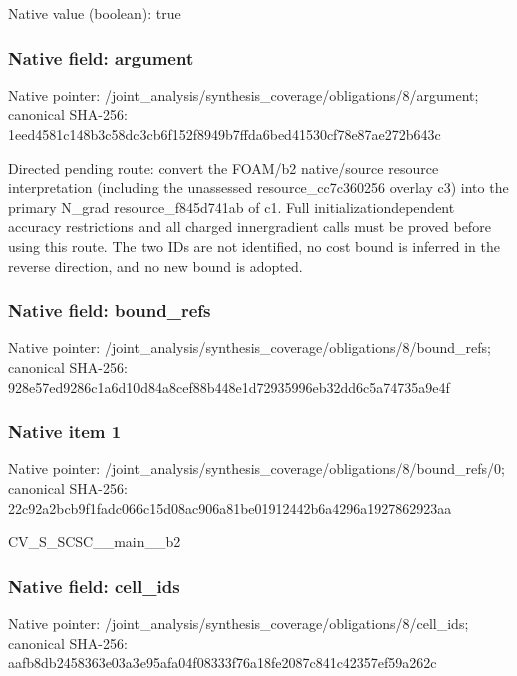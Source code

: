 \documentclass[10pt,a4paper]{article}
\begin{document}
Native value (boolean): true



\subsubsection{Native field: argument}


Native pointer: /joint\_analysis/synthesi\allowbreak{}s\_coverage/obligations/8\allowbreak{}/argument; canonical SHA-256: 1eed4581c148b3c58dc3cb6f\allowbreak{}152f8949b7ffda6bed41530c\allowbreak{}f78e87ae272b643c


Directed pending route: convert the FOAM/b2 native/source resource interpretation (including the unassessed resource\_cc7c360256 overlay c3) into the primary N\_grad resource\_f845d741ab of c1. Full initializationdependent accuracy restrictions and all charged innergradient calls must be proved before using this route. The two IDs are not identified, no cost bound is inferred in the reverse direction, and no new bound is adopted.


\subsubsection{Native field: bound\_refs}


Native pointer: /joint\_analysis/synthesi\allowbreak{}s\_coverage/obligations/8\allowbreak{}/bound\_refs; canonical SHA-256: 928e57ed9286c1a6d10d84a8\allowbreak{}cef88b448e1d72935996eb32\allowbreak{}dd6c5a74735a9e4f



\subsubsection{Native item 1}


Native pointer: /joint\_analysis/synthesi\allowbreak{}s\_coverage/obligations/8\allowbreak{}/bound\_refs/0; canonical SHA-256: 22c92a2bcb9f1fadc066c15d\allowbreak{}08ac906a81be01912442b6a4\allowbreak{}296a1927862923aa


CV\_S\_SCSC\_\_main\_\_b2


\subsubsection{Native field: cell\_ids}


Native pointer: /joint\_analysis/synthesi\allowbreak{}s\_coverage/obligations/8\allowbreak{}/cell\_ids; canonical SHA-256: aafb8db2458363e03a3e95af\allowbreak{}a04f08333f76a18fe2087c84\allowbreak{}1c42357ef59a262c
\end{document}
